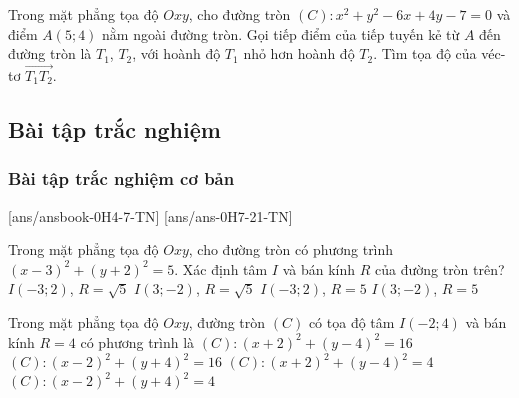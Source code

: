 \begin{bt}%
	Trong mặt phẳng tọa độ $Oxy$, cho đường tròn $(C): x^2+y^2-6x+4y-7=0$ và điểm $A(5; 4)$ nằm ngoài đường tròn. Gọi tiếp điểm của tiếp tuyến kẻ từ $A$ đến đường tròn là $T_1$, $T_2$, với hoành độ $T_1$ nhỏ hơn hoành độ $T_2$. Tìm tọa độ của véc-tơ $\overrightarrow{T_1T_2}$. 
\end{bt}

\subsection{Bài tập trắc nghiệm}
\subsubsection{Bài tập trắc nghiệm cơ bản}
[ans/ansbook-0H4-7-TN]
[ans/ans-0H7-21-TN]
\begin{ex}%
	Trong mặt phẳng tọa độ $Oxy$, cho đường tròn có phương trình $(x-3)^2+(y+2)^2=5$. Xác định tâm $I$ và bán kính $R$ của đường tròn trên?
	\choice
	{$I(-3;2)$, $R = \sqrt{5}$}
	{\True $I(3;-2)$, $R = \sqrt{5}$}
	{$I(-3;2)$, $R = 5$}
	{$I(3;-2)$, $R =5$}
\end{ex}

\begin{ex}%
	Trong mặt phẳng tọa độ $Oxy$, đường tròn $(C)$ có tọa độ tâm $I(-2 ; 4)$ và bán kính $R = 4$ có phương trình là 
	\choice
	{\True $(C)\colon (x + 2)^2 + (y - 4)^2 = 16$}
	{$(C)\colon (x - 2)^2 + (y + 4)^2 = 16$}
	{$(C)\colon (x + 2)^2 + (y - 4)^2 = 4$}
	{$(C)\colon (x - 2)^2 + (y + 4)^2 = 4$}
\end{ex}

